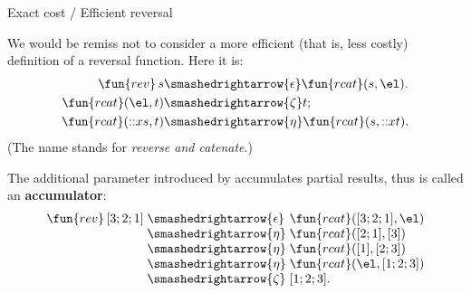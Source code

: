 %
\begin{frame}{Exact cost / Efficient reversal}

  \label{def:rev}

  We would be remiss not to consider a more efficient (that is, less
  costly) definition of a reversal function. Here it is:
  \begin{align*}
    \fun{rev}\,s &\smashedrightarrow{\epsilon} \fun{rcat}(s,\el).\\
    \fun{rcat}(\el,t) & \smashedrightarrow{\zeta} t;\\
    \fun{rcat}(\cons{x}{s},t) &\smashedrightarrow{\eta}
    \fun{rcat}(s,\cons{x}{t}).
  \end{align*}
  (The name  stands for \emph{reverse and catenate}.)

  \bigskip

  The additional parameter introduced by  accumulates
  partial results, thus is called an \textbf{accumulator}:
  \begin{equation*}
    \begin{array}{r@{\;}l@{\;}l}
      \fun{rev}\,[3;2;1]
      & \smashedrightarrow{\epsilon} & \fun{rcat}([3;2;1],\el)\\
      & \smashedrightarrow{\eta}     & \fun{rcat}([2;1],[3])\\
      & \smashedrightarrow{\eta}     & \fun{rcat}([1],[2;3])\\
      & \smashedrightarrow{\eta}     & \fun{rcat}(\el,[1;2;3])\\
      & \smashedrightarrow{\zeta}    & [1;2;3].
    \end{array}
  \end{equation*}

\end{frame}

